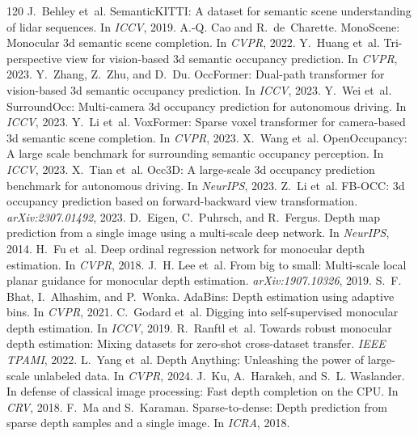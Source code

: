 \documentclass[10pt,twocolumn]{article}
\begin{document}
\begin{thebibliography}{120}
 J.~Behley et~al. SemanticKITTI: A dataset for semantic scene understanding of lidar sequences. In \emph{ICCV}, 2019.
 A.-Q. Cao and R.~de~Charette. MonoScene: Monocular 3d semantic scene completion. In \emph{CVPR}, 2022.
 Y.~Huang et~al. Tri-perspective view for vision-based 3d semantic occupancy prediction. In \emph{CVPR}, 2023.
 Y.~Zhang, Z.~Zhu, and D.~Du. OccFormer: Dual-path transformer for vision-based 3d semantic occupancy prediction. In \emph{ICCV}, 2023.
 Y.~Wei et~al. SurroundOcc: Multi-camera 3d occupancy prediction for autonomous driving. In \emph{ICCV}, 2023.
 Y.~Li et~al. VoxFormer: Sparse voxel transformer for camera-based 3d semantic scene completion. In \emph{CVPR}, 2023.
 X.~Wang et~al. OpenOccupancy: A large scale benchmark for surrounding semantic occupancy perception. In \emph{ICCV}, 2023.
 X.~Tian et~al. Occ3D: A large-scale 3d occupancy prediction benchmark for autonomous driving. In \emph{NeurIPS}, 2023.
 Z.~Li et~al. FB-OCC: 3d occupancy prediction based on forward-backward view transformation. \emph{arXiv:2307.01492}, 2023.
 D.~Eigen, C.~Puhrsch, and R.~Fergus. Depth map prediction from a single image using a multi-scale deep network. In \emph{NeurIPS}, 2014.
 H.~Fu et~al. Deep ordinal regression network for monocular depth estimation. In \emph{CVPR}, 2018.
 J.~H. Lee et~al. From big to small: Multi-scale local planar guidance for monocular depth estimation. \emph{arXiv:1907.10326}, 2019.
 S.~F. Bhat, I.~Alhashim, and P.~Wonka. AdaBins: Depth estimation using adaptive bins. In \emph{CVPR}, 2021.
 C.~Godard et~al. Digging into self-supervised monocular depth estimation. In \emph{ICCV}, 2019.
 R.~Ranftl et~al. Towards robust monocular depth estimation: Mixing datasets for zero-shot cross-dataset transfer. \emph{IEEE TPAMI}, 2022.
 L.~Yang et~al. Depth Anything: Unleashing the power of large-scale unlabeled data. In \emph{CVPR}, 2024.
 J.~Ku, A.~Harakeh, and S.~L. Waslander. In defense of classical image processing: Fast depth completion on the CPU. In \emph{CRV}, 2018.
 F.~Ma and S.~Karaman. Sparse-to-dense: Depth prediction from sparse depth samples and a single image. In \emph{ICRA}, 2018.

\end{thebibliography}
\end{document}
